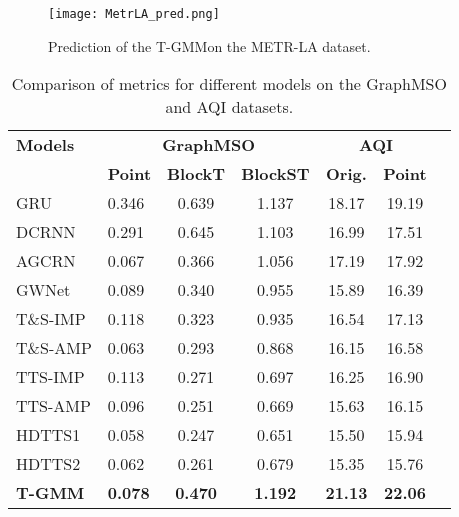 \documentclass{article}
\theoremstyle{plain}
\theoremstyle{definition}
\theoremstyle{remark}
\begin{document}
\begin{figure}[h!]
    \centering
    \texttt{[image: MetrLA\_pred.png]}
    \caption{Prediction of the T-GMMon the METR-LA dataset.}
    \label{fig:metr_la_pred}
\end{figure}

\begin{table}[h!]
\centering
\begin{tabular}{@{}llccc|cc@{}}
\toprule
\textbf{Models}        & \multicolumn{3}{c|}{\textbf{GraphMSO}} & \multicolumn{2}{c}{\textbf{AQI}} \\ 
\cmidrule(lr){2-4} \cmidrule(lr){5-6}
                       & \textbf{Point} & \textbf{BlockT} & \textbf{BlockST} & \textbf{Orig.} & \textbf{Point} \\ \midrule
GRU          & 0.346          & 0.639             & 1.137              & 18.17             & 19.19          \\
DCRNN                  & 0.291          & 0.645             & 1.103              & 16.99             & 17.51          \\
AGCRN                  & 0.067          & 0.366             & 1.056              & 17.19             & 17.92          \\
GWNet                  & 0.089          & 0.340             & 0.955              & 15.89             & 16.39          \\
T\&S-IMP               & 0.118          & 0.323             & 0.935              & 16.54             & 17.13          \\
T\&S-AMP               & 0.063          & 0.293             & 0.868              & 16.15             & 16.58          \\
TTS-IMP                & 0.113          & 0.271             & 0.697              & 16.25             & 16.90          \\
TTS-AMP                & 0.096          & 0.251             & 0.669              & 15.63             & 16.15          \\
HDTTS1             & 0.058          & 0.247             & 0.651              & 15.50             & 15.94          \\
HDTTS2             & 0.062          & 0.261             & 0.679              & 15.35             & 15.76          \\
\textbf{T-GMM}         & \textbf{0.078} & \textbf{0.470}    & \textbf{1.192}     & \textbf{21.13}    & \textbf{22.06} \\
\bottomrule
\end{tabular}
\caption{Comparison of metrics for different models on the GraphMSO and AQI datasets.}
\label{tab:grouped_metrics}
\end{table}
\end{document}
